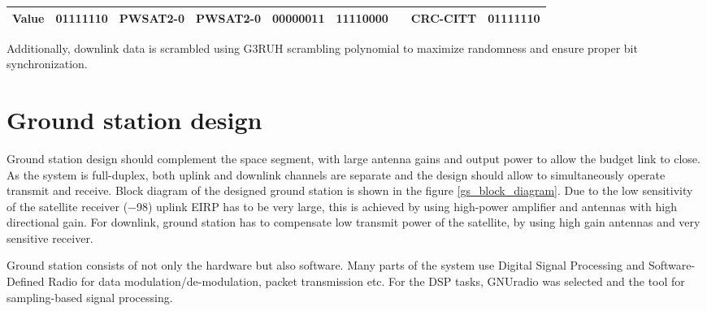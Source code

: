 \begin{table}
\begin{tabular}{l|c|c|c|c|c|c|c|c|}
\hline
\multicolumn{1}{|c|}{Value}                                                    & 01111110               & PWSAT2-0                                                     & PWSAT2-0                                                & 00000011                                              & 11110000                                                     & {\cellcolor[rgb]{0.753,0.753,0.753}}                                                                                                                  & CRC-CITT                                                                         & 01111110               \\
\hline
\end{tabular}
\end{table}


Additionally, downlink data is scrambled using G3RUH scrambling polynomial to maximize randomness and ensure proper bit synchronization.


\section{Ground station design}
Ground station design should complement the space segment, with large antenna gains and output power to allow the budget link to close. As the system is full-duplex, both uplink and downlink channels are separate and the design should allow to simultaneously operate transmit and receive. Block diagram of the designed ground station is shown in the figure \ref{gs_block_diagram}.
Due to the low sensitivity of the satellite receiver (\SI{-98}{\dBm}) uplink EIRP has to be very large, this is achieved by using high-power amplifier and antennas with high directional gain. For downlink, ground station has to compensate low transmit power of the satellite, by using high gain antennas and very sensitive receiver.

Ground station consists of not only the hardware but also software. Many parts of the system use Digital Signal Processing and Software-Defined Radio for data modulation/de-modulation, packet transmission etc. For the DSP tasks, GNUradio \cite{gnuradio} was selected and the tool for sampling-based signal processing.



